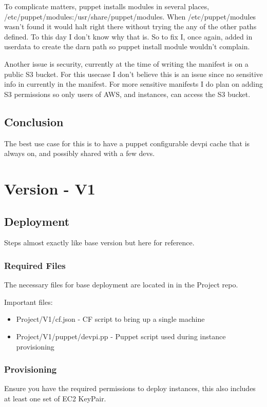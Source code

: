 \documentclass[12pt, letterpaper]{article}
\begin{document}
To complicate matters, puppet installs modules in several places, /etc/puppet/modules:/usr/share/puppet/modules. When 
/etc/puppet/modules wasn't found it would halt right there without trying the any of the other paths defined. To this day I
don't know why that is. So to fix I, once again, added in userdata to create the darn path so puppet install module wouldn't
complain.

Another issue is security, currently at the time of writing the manifest is on a public S3 bucket. For this usecase I don't
believe this is an issue since no sensitive info in currently in the manifest. For more sensitive manifests I do plan on adding
S3 permissions so only users of AWS, and instances, can access the S3 bucket.

\subsection{Conclusion}
The best use case for this is to have a puppet configurable devpi cache that is always on, and possibly shared with a few devs. 

\section{Version - V1}

\subsection{Deployment}
Steps almost exactly like base version but here for reference.

\subsubsection{Required Files}
The necessary files for base deployment are located in in the Project repo.

Important files:
\begin{itemize}
    \item Project/V1/cf.json - CF script to bring up a single machine
    \item Project/V1/puppet/devpi.pp - Puppet script used during instance provisioning
\end{itemize}

\subsubsection{Provisioning}
Ensure you have the required permissions to deploy instances, this also includes at least one set of EC2 KeyPair.
\end{document}

